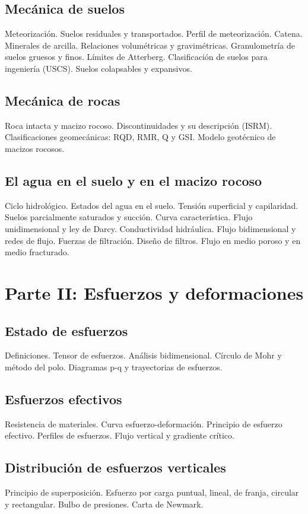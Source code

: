 \documentclass[a4paper,twoside,11pt]{article}
\begin{document}
\subsection{Mecánica de suelos}
Meteorización. Suelos residuales y transportados. Perfil de meteorización. Catena. Minerales de arcilla.
Relaciones volumétricas y gravimétricas. Granulometría de suelos gruesos y finos. Límites de Atterberg.
Clasificación de suelos para ingeniería (USCS). Suelos colapsables y expansivos.

\subsection{Mecánica de rocas}
Roca intacta y macizo rocoso. Discontinuidades y su descripción (ISRM). Clasificaciones geomecánicas:
RQD, RMR, Q y GSI. Modelo geotécnico de macizos rocosos.

\subsection{El agua en el suelo y en el macizo rocoso}
Ciclo hidrológico. Estados del agua en el suelo. Tensión superficial y capilaridad. Suelos parcialmente
saturados y succión. Curva característica. Flujo unidimensional y ley de Darcy. Conductividad hidráulica.
Flujo bidimensional y redes de flujo. Fuerzas de filtración. Diseño de filtros. Flujo en medio poroso y en
medio fracturado.

\section*{Parte II: Esfuerzos y deformaciones}

\subsection{Estado de esfuerzos}
Definiciones. Tensor de esfuerzos. Análisis bidimensional. Círculo de Mohr y método del polo.
Diagramas p-q y trayectorias de esfuerzos.

\subsection{Esfuerzos efectivos}
Resistencia de materiales. Curva esfuerzo-deformación. Principio de esfuerzo efectivo. Perfiles de
esfuerzos. Flujo vertical y gradiente crítico.

\subsection{Distribución de esfuerzos verticales}
Principio de superposición. Esfuerzo por carga puntual, lineal, de franja, circular y rectangular.
Bulbo de presiones. Carta de Newmark.
\end{document}
